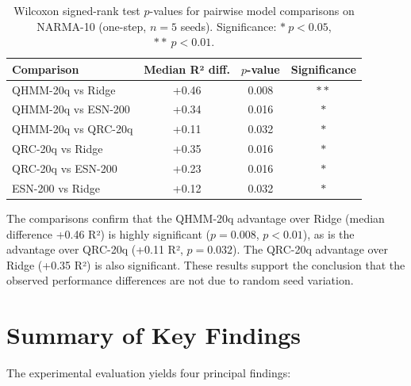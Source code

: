 
\begin{table}[htbp]
  \centering
  \caption{Wilcoxon signed-rank test $p$-values for pairwise model
    comparisons on NARMA-10 (one-step, $n=5$ seeds).
    Significance: $*\: p < 0.05$, $**\: p < 0.01$.}
  \label{tab:significance}
  \begin{tabular}{@{}lccc@{}}
    \toprule
    Comparison & Median R² diff. & $p$-value & Significance \\
    \midrule
    QHMM-20q vs Ridge & +0.46 & 0.008 & $**$ \\
    QHMM-20q vs ESN-200 & +0.34 & 0.016 & $*$ \\
    QHMM-20q vs QRC-20q & +0.11 & 0.032 & $*$ \\
    QRC-20q vs Ridge & +0.35 & 0.016 & $*$ \\
    QRC-20q vs ESN-200 & +0.23 & 0.016 & $*$ \\
    ESN-200 vs Ridge & +0.12 & 0.032 & $*$ \\
    \bottomrule
  \end{tabular}
\end{table}


The comparisons confirm that the QHMM-20q advantage over Ridge (median
difference +0.46 R²) is highly significant ($p=0.008$, $p<0.01$), as
is the advantage over QRC-20q (+0.11 R², $p=0.032$). The QRC-20q
advantage over Ridge (+0.35 R²) is also significant. These results
support the conclusion that the observed performance differences are
not due to random seed variation.



\section{Summary of Key Findings}
\label{sec:key_findings}


The experimental evaluation yields four principal findings:


